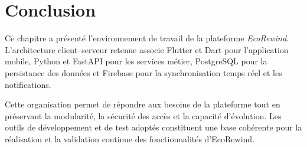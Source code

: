\section{Conclusion}

Ce chapitre a présenté l'environnement de travail de la plateforme \textit{EcoRewind}. L'architecture client--serveur retenue associe Flutter et Dart pour l'application mobile, Python et FastAPI pour les services métier, PostgreSQL pour la persistance des données et Firebase pour la synchronisation temps réel et les notifications.

Cette organisation permet de répondre aux besoins de la plateforme tout en préservant la modularité, la sécurité des accès et la capacité d'évolution. Les outils de développement et de test adoptés constituent une base cohérente pour la réalisation et la validation continue des fonctionnalités d'EcoRewind.
